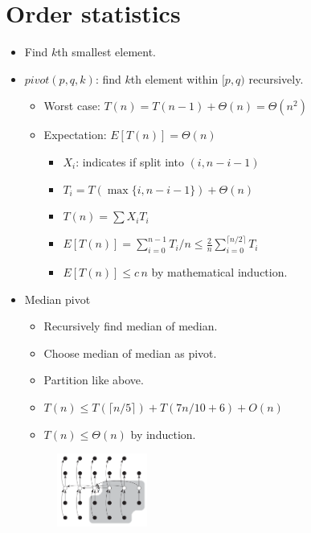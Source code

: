 \documentclass[twocolumn]{article}
\begin{document}
\section{Order statistics}
\begin{itemize}
\item Find $k$th smallest element.
\item $pivot(p, q, k)$: find $k$th element within $[p, q)$ recursively.
  \begin{itemize}
  \item Worst case: $T(n) = T(n-1) + \Theta(n) = \Theta(n^2)$
  \item Expectation: $E[T(n)] = \Theta(n)$
    \begin{itemize}
    \item $X_i$: indicates if split into $(i, n-i-1)$
    \item $T_i = T(\max \{i, n-i-1\}) + \Theta(n)$
    \item $T(n) = \sum X_i T_i$
    \item $E[T(n)] = \sum_{i=0}^{n-1} T_i / n \le \frac{2}{n} \sum_{i=0}^{\lceil n/2 \rceil} T_i$
    \item $E[T(n)] \le c\,n$ by mathematical induction.
    \end{itemize}
  \end{itemize}
\item Median pivot
  \begin{itemize}
  \item Recursively find median of median.
  \item Choose median of median as pivot.
  \item Partition like above.
  \item $T(n) \le T(\lceil n/5 \rceil) + T(7n/10+6)+O(n)$
  \item $T(n) \le \Theta(n)$ by induction.
  \end{itemize}
  \begin{figure}[H]
  \centering
  \includegraphics[width=0.28\textwidth]{assets/mpivot}
  \end{figure}
\end{itemize}

\end{document}
